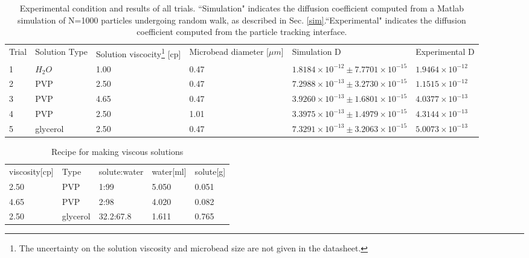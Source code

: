 \documentclass[iop,revtex4]{emulateapj_mod}
\begin{document}
\begin{table}[t]
\centering
\caption{Experimental condition and results of all trials. ``Simulation" indicates the diffusion coefficient computed from a Matlab simulation of N=1000 particles undergoing random walk, as described in Sec. \ref{sim}.``Experimental" indicates the diffusion coefficient computed from the particle tracking interface. }
\label{my-label}
\begin{tabular}{llllll} \label{table}
Trial & Solution Type & Solution viscocity\footnote{The uncertainty on the solution viscosity and microbead size are not given in the datasheet.} [cp] & Microbead diameter [$\mu m$] & Simulation D          & Experimental D \\
1     & $H_2O$         &  1.00                           & 0.47                              & $1.8184\times 10^{-12}\pm 7.7701\times 10^{-15}$ & $1.9464\times 10^{-12}$     \\
2     & PVP           & 2.50                        & 0.47                              & $7.2988\times 10^{-13}\pm3.2730\times 10^{-15}$ & $1.1515\times 10^{-12}$     \\
3     & PVP           & 4.65                        & 0.47                              & $3.9260\times 10^{-13}\pm1.6801\times 10^{-15}$ & $4.0377\times 10^{-13}$     \\
4     & PVP           & 2.50                        & 1.01                              & $3.3975\times 10^{-13}\pm1.4979\times 10^{-15}$ & $4.3144\times 10^{-13}$     \\
5     & glycerol      & 2.50                        & 0.47                              & $7.3291\times 10^{-13}\pm3.2063\times 10^{-15}$ & $5.0073\times 10^{-13}$    
\end{tabular}
\end{table}
\begin{table}[]
\centering
\caption{Recipe for making viscous solutions}
\label{solution}
\begin{tabular}{lllll}
viscosity[cp] & Type & solute:water & water[ml] & solute[g] \\
 2.50      & PVP         & 1:99         & 5.050 & 0.051  \\
 4.65      & PVP         & 2:98         & 4.020 & 0.082  \\
 2.50      & glycerol    & 32.2:67.8    & 1.611 & 0.765 
\end{tabular}
\end{table}
\end{document}
